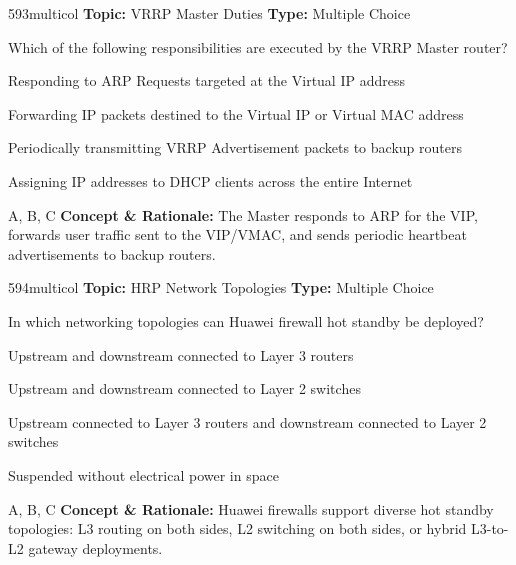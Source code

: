 \begin{qcard}{593}{multicol}
\textcolor{darkslate!75}{\small\textbf{Topic:} VRRP Master Duties \hfill \textbf{Type:} Multiple Choice}\vspace{0.4em}\par
Which of the following responsibilities are executed by the VRRP Master router?
\begin{qoptions}
\item Responding to ARP Requests targeted at the Virtual IP address
\item Forwarding IP packets destined to the Virtual IP or Virtual MAC address
\item Periodically transmitting VRRP Advertisement packets to backup routers
\item Assigning IP addresses to DHCP clients across the entire Internet
\end{qoptions}
\end{qcard}
\nopagebreak
\begin{explainbox}{A, B, C}
\textbf{Concept \& Rationale:} The Master responds to ARP for the VIP, forwards user traffic sent to the VIP/VMAC, and sends periodic heartbeat advertisements to backup routers.
\end{explainbox}

\begin{qcard}{594}{multicol}
\textcolor{darkslate!75}{\small\textbf{Topic:} HRP Network Topologies \hfill \textbf{Type:} Multiple Choice}\vspace{0.4em}\par
In which networking topologies can Huawei firewall hot standby be deployed?
\begin{qoptions}
\item Upstream and downstream connected to Layer 3 routers
\item Upstream and downstream connected to Layer 2 switches
\item Upstream connected to Layer 3 routers and downstream connected to Layer 2 switches
\item Suspended without electrical power in space
\end{qoptions}
\end{qcard}
\nopagebreak
\begin{explainbox}{A, B, C}
\textbf{Concept \& Rationale:} Huawei firewalls support diverse hot standby topologies: L3 routing on both sides, L2 switching on both sides, or hybrid L3-to-L2 gateway deployments.
\end{explainbox}

